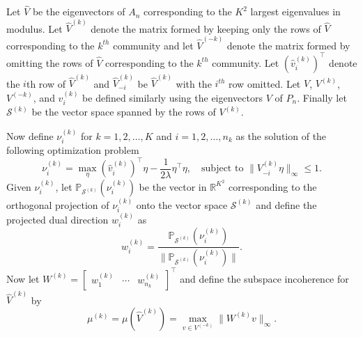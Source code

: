 \documentclass[12pt]{article}
\begin{document}
\begin{definition}
  \label{def:subspace_incoherence}
Let $\hat{V}$ be the eigenvectors of $A_n$
corresponding to the $K^2$ largest eigenvalues in modulus. Let
$\hat{V}^{(k)}$ denote the matrix formed by keeping only the rows of
$\hat{V}$ corresponding to the $k^{th}$
community and let $\hat{V}^{(-k)}$ denote the matrix formed by
omitting the rows of $\hat{V}$
corresponding to the $k^{th}$ community. Let $(\hat{v}_i^{(k)})^\top$ denote
the $i$th row of $\hat{V}^{(k)}$ and $\hat{V}_{-i}^{(k)}$ be $\hat{V}^{(k)}$ with
the $i^{th}$ row omitted. Let $V$, $V^{(k)}$, $V^{(-k)}$, and
$v_i^{(k)}$ be defined similarly using the eigenvectors $V$ of
$P_n$. Finally let $\mathcal{S}^{(k)}$ be the vector space spanned by the
rows of $V^{(k)}$. 

Now define $\nu_{i}^{(k)}$ for $k = 1,2,\dots,K$ and $i =
1,2,\dots,n_{k}$ as the solution of the following optimization problem
$$\nu_{i}^{(k)} = \max_\eta (\hat{v}_i^{(k)})^\top \eta - \frac{1}{2
  \lambda} \eta^\top \eta, \quad \text{subject to $\|V_{-i}^{(k)}
  \eta\|_\infty \leq 1$.}$$
Given $\nu_i^{(k)}$, let $\mathbb{P}_{\mathcal{S}^{(k)}}(\nu_i^{(k)})$
be the vector in $\mathbb{R}^{K^2}$ corresponding to the orthogonal projection of $\nu_i^{(k)}$ onto the vector space
$\mathcal{S}^{(k)}$ and define the projected dual direction $w_{i}^{(k)}$
as
$$w_i^{(k)} =
\frac{\mathbb{P}_{\mathcal{S}^{(k)}}(\nu_i^{(k)})}{\|\mathbb{P}_{\mathcal{S}^{(k)}}(\nu_i^{(k)})\|}.$$
Now let $W^{(k)} = \begin{bmatrix} w_1^{(k)} & \cdots & w_{n_k}^{(k)} \end{bmatrix}^\top$
and define the subspace incoherence for $\hat{V}^{(k)}$ by
$$\mu^{(k)} = \mu(\hat{V}^{(k)}) = \max\limits_{v \in V^{(-k)}} \|W^{(k)} v\|_\infty.$$
\end{definition}

  

\end{document}
